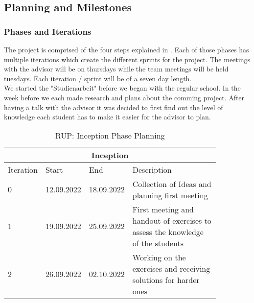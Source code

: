 \subsection{Planning and Milestones}

\subsubsection*{Phases and Iterations}
The project is comprised of the four steps explained in . Each of those phases has multiple iterations which create the different sprints for the project. The meetings with the advisor will be on thursdays while the team meetings will be held tuesdays. Each iteration / sprint will be of a seven day length. \\

\noindent We started the "Studienarbeit" before we began with the regular school. In the week before we each made research and plans about the comming project. After having a talk with the advisor it was decided to first find out the level of knowledge each student has to make it easier for the advisor to plan.
\begin{table}[H]
    \centering
    \begin{tabular}{|p{0.1\linewidth}|p{0.15\linewidth}|p{0.15\linewidth}|p{0.46\linewidth}|}
        \hline
        \multicolumn{4}{||c||}{\textbf{Inception}} \\
        \hline \hline
        Iteration & Start & End & Description \\
        \hline \hline
        0 & 12.09.2022 & 18.09.2022 & Collection of Ideas and planning first meeting\\
        \hline
        1 & 19.09.2022 & 25.09.2022 & First meeting and handout of exercises to assess the knowledge of the students \\
        \hline
        2 & 26.09.2022 & 02.10.2022 & Working on the exercises and receiving solutions for harder ones \\
        \hline
    \end{tabular}
    \caption{RUP: Inception Phase Planning}
    \label{inception_table}
\end{table}

